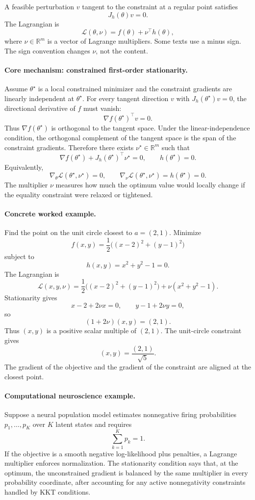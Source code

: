 A feasible perturbation \(v\) tangent to the constraint at a regular point satisfies
\[
J_h(\theta)v=0.
\]
The Lagrangian is
\[
\boxed{
\mathcal L(\theta,\nu)=f(\theta)+\nu^\top h(\theta),
}
\]
where \(\nu\in\mathbb R^m\) is a vector of Lagrange multipliers. Some texts use a minus sign. The sign convention changes \(\nu\), not the content.

\paragraph{Core mechanism: constrained first-order stationarity.}
Assume \(\theta^\star\) is a local constrained minimizer and the constraint gradients are linearly independent at \(\theta^\star\). For every tangent direction \(v\) with \(J_h(\theta^\star)v=0\), the directional derivative of \(f\) must vanish:
\[
\nabla f(\theta^\star)^\top v=0.
\]
Thus \(\nabla f(\theta^\star)\) is orthogonal to the tangent space. Under the linear-independence condition, the orthogonal complement of the tangent space is the span of the constraint gradients. Therefore there exists \(\nu^\star\in\mathbb R^m\) such that
\[
\boxed{
\nabla f(\theta^\star)+J_h(\theta^\star)^\top\nu^\star=0,
\qquad
h(\theta^\star)=0.
}
\]
Equivalently,
\[
\nabla_\theta\mathcal L(\theta^\star,\nu^\star)=0,
\qquad
\nabla_\nu\mathcal L(\theta^\star,\nu^\star)=h(\theta^\star)=0.
\]
The multiplier \(\nu\) measures how much the optimum value would locally change if the equality constraint were relaxed or tightened.

\paragraph{Concrete worked example.}
Find the point on the unit circle closest to \(a=(2,1)\). Minimize
\[
f(x,y)=\frac12\bigl((x-2)^2+(y-1)^2\bigr)
\]
subject to
\[
h(x,y)=x^2+y^2-1=0.
\]
The Lagrangian is
\[
\mathcal L(x,y,\nu)=
\frac12\bigl((x-2)^2+(y-1)^2\bigr)+\nu(x^2+y^2-1).
\]
Stationarity gives
\[
x-2+2\nu x=0,\qquad y-1+2\nu y=0,
\]
so
\[
(1+2\nu)(x,y)=(2,1).
\]
Thus \((x,y)\) is a positive scalar multiple of \((2,1)\). The unit-circle constraint gives
\[
(x,y)=\frac{(2,1)}{\sqrt{5}}.
\]
The gradient of the objective and the gradient of the constraint are aligned at the closest point.

\paragraph{Computational neuroscience example.}
Suppose a neural population model estimates nonnegative firing probabilities \(p_1,\ldots,p_K\) over \(K\) latent states and requires
\[
\sum_{k=1}^K p_k=1.
\]
If the objective is a smooth negative log-likelihood plus penalties, a Lagrange multiplier enforces normalization. The stationarity condition says that, at the optimum, the unconstrained gradient is balanced by the same multiplier in every probability coordinate, after accounting for any active nonnegativity constraints handled by KKT conditions.


